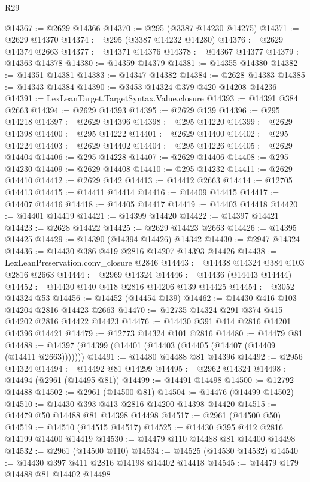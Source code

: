 \begin{lexlean}{R29}
\begin{coremodule}
@14367 := @2629 @14366
@14370 := @295 (@3387 @14230 @14275)
@14371 := @2629 @14370
@14374 := @295 (@3387 @14232 @14280)
@14376 := @2629 @14374 @2663
@14377 := @14371 @14376
@14378 := @14367 @14377
@14379 := @14363 @14378
@14380 := @14359 @14379
@14381 := @14355 @14380
@14382 := @14351 @14381
@14383 := @14347 @14382
@14384 := @2628 @14383
@14385 := @14343 @14384
@14390 := @3453 @14324 @379 @420 @14208 @14236
@14391 := LexLeanTarget.TargetSyntax.Value.closure
@14393 := @14391 @384 @2663
@14394 := @2629 @14393
@14395 := @2629 @139
@14396 := @295 @14218
@14397 := @2629 @14396
@14398 := @295 @14220
@14399 := @2629 @14398
@14400 := @295 @14222
@14401 := @2629 @14400
@14402 := @295 @14224
@14403 := @2629 @14402
@14404 := @295 @14226
@14405 := @2629 @14404
@14406 := @295 @14228
@14407 := @2629 @14406
@14408 := @295 @14230
@14409 := @2629 @14408
@14410 := @295 @14232
@14411 := @2629 @14410
@14412 := @2629 @142
@14413 := @14412 @2663
@14414 := @12705 @14413
@14415 := @14411 @14414
@14416 := @14409 @14415
@14417 := @14407 @14416
@14418 := @14405 @14417
@14419 := @14403 @14418
@14420 := @14401 @14419
@14421 := @14399 @14420
@14422 := @14397 @14421
@14423 := @2628 @14422
@14425 := @2629 @14423 @2663
@14426 := @14395 @14425
@14429 := @14390 (@14394 @14426) @14342
@14430 := @2947 @14324
@14436 := @14430 @386 @419 @2816 @14207 @14393 @14426
@14438 := LexLeanPreservation.conv_closure @2846
@14443 := @14438 @14324 @384 @103 @2816 @2663
@14444 := @2969 @14324
@14446 := @14436 (@14443 @14444)
@14452 := @14430 @140 @418 @2816 @14206 @139 @14425
@14454 := @3052 @14324 @53
@14456 := @14452 (@14454 @139)
@14462 := @14430 @416 @103 @14204 @2816 @14423 @2663
@14470 := @12735 @14324 @291 @374 @415 @14202 @2816 @14422 @14423
@14476 := @14430 @391 @414 @2816 @14201 @14396 @14421
@14479 := @12773 @14324 @101 @2816
@14480 := @14479 @81
@14488 := @14397 (@14399 (@14401 (@14403 (@14405 (@14407 (@14409 (@14411 @2663)))))))
@14491 := @14480 @14488 @81 @14396
@14492 := @2956 @14324
@14494 := @14492 @81 @14299
@14495 := @2962 @14324
@14498 := @14494 (@2961 (@14495 @81))
@14499 := @14491 @14498
@14500 := @12792 @14488
@14502 := @2961 (@14500 @81)
@14504 := @14476 (@14499 @14502)
@14510 := @14430 @393 @413 @2816 @14200 @14398 @14420
@14515 := @14479 @50 @14488 @81 @14398 @14498
@14517 := @2961 (@14500 @50)
@14519 := @14510 (@14515 @14517)
@14525 := @14430 @395 @412 @2816 @14199 @14400 @14419
@14530 := @14479 @110 @14488 @81 @14400 @14498
@14532 := @2961 (@14500 @110)
@14534 := @14525 (@14530 @14532)
@14540 := @14430 @397 @411 @2816 @14198 @14402 @14418
@14545 := @14479 @179 @14488 @81 @14402 @14498

\end{coremodule}
\end{lexlean}
